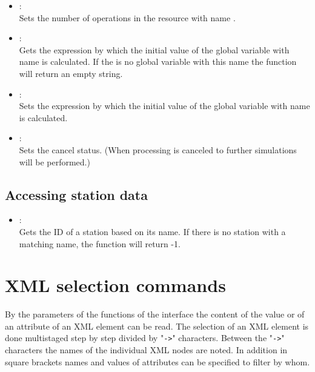 \begin{itemize}
\item
{}:\\
Sets the number of operations in the resource with name .

\item
{}:\\
Gets the expression by which the initial value of the global variable with
name  is calculated. If the is no global variable with
this name the function will return an empty string.

\item
{}:\\
Sets the expression by which the initial value of the global variable with
name  is calculated.

\item
{}:\\
Sets the cancel status. (When processing is canceled to further simulations will be performed.)

\end{itemize}

\section{Accessing station data}

\begin{itemize}

\item
{}:\\
Gets the ID of a station based on its name.
If there is no station with a matching name, the function will return -1.

\end{itemize}



\chapter{XML selection commands}

By the parameters of the functions of the  interface the content of the
value or of an attribute of an XML element can be read.
The selection of an XML element is done multistaged step by step divided by
"\texttt{->}" characters. Between the "\texttt{->}" characters the names of the individual XML nodes are
noted. In addition in square brackets names and values of attributes can be specified to filter by whom.

